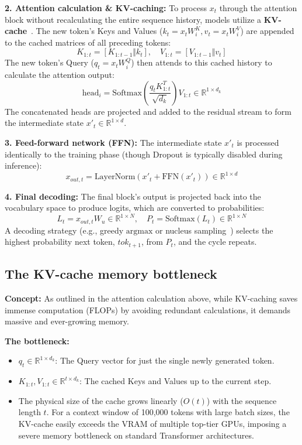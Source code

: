 \documentclass[11pt]{article}
\begin{document}
	\textbf{2. Attention calculation \& KV-caching:} To process $x_t$ through the attention block without recalculating the entire sequence history, models utilize a \textbf{KV-cache}~\cite{shazeer2019fast}. The new token's Keys and Values ($k_t = x_t W_i^K, v_t = x_t W_i^V$) are appended to the cached matrices of all preceding tokens:
	\begin{equation}
		K_{1:t} = [K_{1:t-1} \Vert k_t], \quad V_{1:t} = [V_{1:t-1} \Vert v_t]
	\end{equation}
	The new token's Query ($q_t = x_t W_i^Q$) then attends to this cached history to calculate the attention output:
	\begin{equation}
		\text{head}_i = \text{Softmax}\left(\frac{q_t K_{1:t}^T}{\sqrt{d_k}}\right) V_{1:t} \in \mathbb{R}^{1 \times d_k}
	\end{equation}
	The concatenated heads are projected and added to the residual stream to form the intermediate state $x'_t \in \mathbb{R}^{1 \times d}$.
	
	\textbf{3. Feed-forward network (FFN):} The intermediate state $x'_t$ is processed identically to the training phase (though Dropout is typically disabled during inference):
	\begin{equation}
		x_{out,t} = \text{LayerNorm}(x'_t + \text{FFN}(x'_t)) \in \mathbb{R}^{1 \times d}
	\end{equation}
	
	\textbf{4. Final decoding:} The final block's output is projected back into the vocabulary space to produce logits, which are converted to probabilities:
	\begin{equation}
		L_t = x_{out,t} W_u \in \mathbb{R}^{1 \times N}, \quad P_t = \text{Softmax}(L_t) \in \mathbb{R}^{1 \times N}
	\end{equation}
	A decoding strategy (e.g., greedy $\text{argmax}$ or nucleus sampling~\cite{holtzman2019curious}) selects the highest probability next token, $tok_{t+1}$, from $P_t$, and the cycle repeats.
	
	\subsection{The KV-cache memory bottleneck}
	\textbf{Concept:} As outlined in the attention calculation above, while KV-caching saves immense computation (FLOPs) by avoiding redundant calculations, it demands massive and ever-growing memory.
	
	\textbf{The bottleneck:} 
	\begin{itemize}
		\item $q_t \in \mathbb{R}^{1 \times d_k}$: The Query vector for just the single newly generated token.
		\item $K_{1:t}, V_{1:t} \in \mathbb{R}^{t \times d_k}$: The cached Keys and Values up to the current step.
		\item The physical size of the cache grows linearly ($O(t)$) with the sequence length $t$. For a context window of 100,000 tokens with large batch sizes, the KV-cache easily exceeds the VRAM of multiple top-tier GPUs, imposing a severe memory bottleneck on standard Transformer architectures.
	\end{itemize}
	
\end{document}
